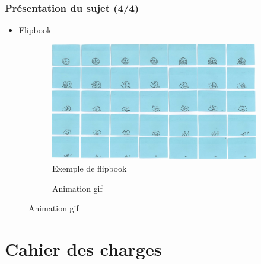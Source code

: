 \documentclass{beamer}
\begin{document}
\begin{frame}

\frametitle{Présentation du sujet (4/4)}

\begin{itemize}[label=$\bullet$]
\item Flipbook
\end{itemize}
\begin{figure}
\centering
\begin{subfigure}{.5\textwidth}
  \centering
  \includegraphics[scale=0.5]{flipbook.png}
	\caption{Exemple de flipbook\footnotemark}
\end{subfigure}
\begin{subfigure}{.3\textwidth}
  \centering
  \caption{Animation gif\footnotemark}
  \vspace*{-1.5cm}
 \end{subfigure}
\end{figure}


  
\end{frame}

%
\section{Cahier des charges}
\end{document}
